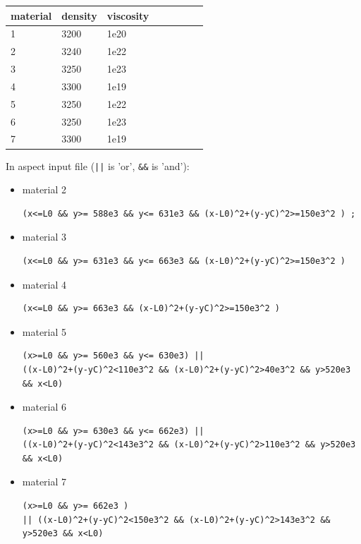 \begin{center}
\begin{tabular}{llllllll}
\hline
material & density & viscosity \\
\hline\hline
1& 3200& 1e20\\ 
2& 3240& 1e22\\
3& 3250& 1e23\\
4& 3300& 1e19\\
5& 3250& 1e22\\
6& 3250& 1e23\\
7& 3300& 1e19\\
\hline
\end{tabular}
\end{center}

In aspect input file ({\tt ||} is 'or', {\tt \&\&}  is 'and'):
\begin{itemize}
\item material 2
\begin{verbatim}
(x<=L0 && y>= 588e3 && y<= 631e3 && (x-L0)^2+(y-yC)^2>=150e3^2 ) ; 
\end{verbatim}
\item material 3
\begin{verbatim}
(x<=L0 && y>= 631e3 && y<= 663e3 && (x-L0)^2+(y-yC)^2>=150e3^2 ) 
\end{verbatim}
\item material 4
\begin{verbatim}
(x<=L0 && y>= 663e3 && (x-L0)^2+(y-yC)^2>=150e3^2 )
\end{verbatim}
\item material 5
\begin{verbatim}
(x>=L0 && y>= 560e3 && y<= 630e3) || 
((x-L0)^2+(y-yC)^2<110e3^2 && (x-L0)^2+(y-yC)^2>40e3^2 && y>520e3 && x<L0) 
\end{verbatim}
\item material 6
\begin{verbatim}
(x>=L0 && y>= 630e3 && y<= 662e3) || 
((x-L0)^2+(y-yC)^2<143e3^2 && (x-L0)^2+(y-yC)^2>110e3^2 && y>520e3 && x<L0) 
\end{verbatim}
\item material 7
\begin{verbatim}
(x>=L0 && y>= 662e3 )  
|| ((x-L0)^2+(y-yC)^2<150e3^2 && (x-L0)^2+(y-yC)^2>143e3^2 && y>520e3 && x<L0) 
\end{verbatim}
\end{itemize}






